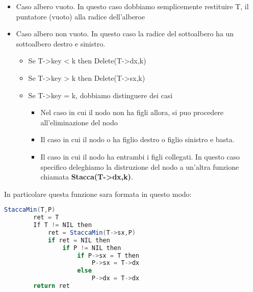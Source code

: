 \begin{itemize}
	\item Caso albero vuoto. In questo caso dobbiamo semplicemente restituire T, il puntatore (vuoto) alla radice dell'alberoe
	\item Caso albero non vuoto. In questo caso la radice del sottoalbero ha un sottoalbero destro e sinistro.
		\begin{itemize}
			\item Se T->key < k then Delete(T->dx,k)
			\item Se T->key > k then Delete(T->sx,k)
			\item Se T->key = k, dobbiamo distinguere dei casi
			\begin{itemize}
				\item Nel caso in cui il nodo non ha figli allora, si puo procedere all'eliminazione del nodo
				\item Il caso in cui il nodo o ha figlio destro o figlio sinistro e basta.
				\item Il caso in cui il nodo ha entrambi i figli collegati. In questo caso specifico deleghiamo la distruzione del nodo a un'altra funzione chiamata \textbf{Stacca(T->dx,k)}.
			\end{itemize}
		\end{itemize}
\end{itemize}

In particolare questa funzione sara formata in questo modo:

\begin{lstlisting}[language=Java]
	StaccaMin(T,P)
		ret = T
		If T != NIL then
			ret = StaccaMin(T->sx,P)
			if ret = NIL then
				if P != NIL then
					if P->sx = T then
						P->sx = T->dx
					else
						P->dx = T->dx
		return ret
\end{lstlisting}


